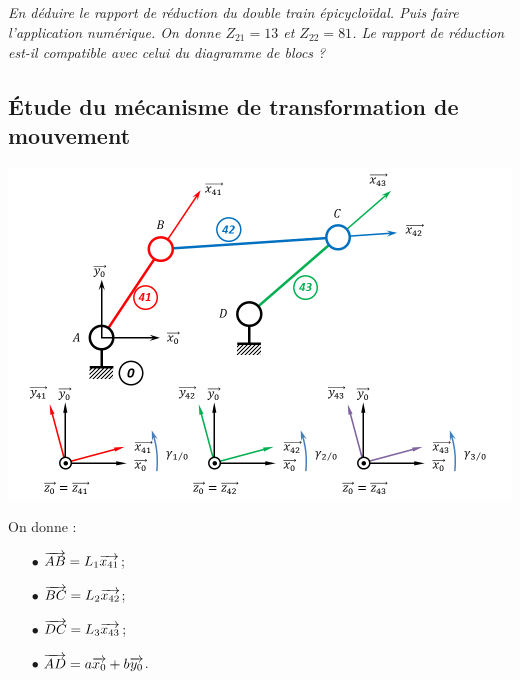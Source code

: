 \documentclass[11pt,oneside]{article}
\begin{document}
\subparagraph{}
\textit{En déduire le rapport de réduction du double train épicycloïdal. Puis faire l'application numérique. On donne $Z_{21}=13$ et $Z_{22}=81$. Le rapport de réduction est-il compatible avec celui du diagramme de blocs ?}


\subsection{Étude du mécanisme de transformation de mouvement}

\begin{center}
\includegraphics[width=.95\textwidth]{png/A6_3barres}
\end{center}

On donne : 

\begin{minipage}[c]{.45\linewidth}
\begin{itemize}
\item [$\bullet$] $\overrightarrow{AB}=L_1\overrightarrow{x_{41}}$;
\item [$\bullet$] $\overrightarrow{BC}=L_2\overrightarrow{x_{42}}$;
\end{itemize}
\end{minipage}\hfill
\begin{minipage}[c]{.45\linewidth}
\begin{itemize}
\item [$\bullet$] $\overrightarrow{DC}=L_3\overrightarrow{x_{43}}$;
\item [$\bullet$] $\overrightarrow{AD}=a\overrightarrow{x_{0}}+b\overrightarrow{y_{0}}$.
\end{itemize}
\end{minipage}
\end{document}
